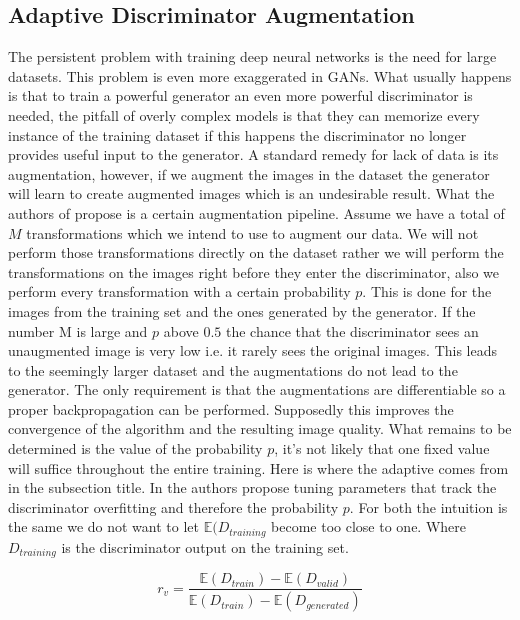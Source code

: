 \documentclass[conference]{IEEEtran}
\begin{document}
\subsection{Adaptive Discriminator Augmentation}
The persistent problem with training deep neural networks is the need for large datasets. This problem is even more exaggerated in GANs. What usually happens is that to train a powerful generator an even more powerful discriminator is needed, the pitfall of overly complex models is that they can memorize every instance of the training dataset if this happens the discriminator no longer provides useful input to the generator.
A standard remedy for lack of data is its augmentation, however, if we augment the images in the dataset the generator will learn to create augmented images which is an undesirable result. What the authors of \cite{STLEGAN2ADA} propose is a certain augmentation pipeline. Assume we have a total of $M$ transformations which we intend to use to augment our data. We will not perform those transformations directly on the dataset rather we will perform the transformations on the images right before they enter the discriminator, also we perform every transformation with a certain probability $p$. This is done for the images from the training set and the ones generated by the generator.
If the number M is large and $p$ above $0.5$ the chance that the discriminator sees an unaugmented image is very low i.e. it rarely sees the original images. This leads to the seemingly larger dataset and the augmentations do not lead to the generator. The only requirement is that the augmentations are differentiable so a proper backpropagation can be performed. Supposedly this improves the convergence of the algorithm and the resulting image quality.
What remains to be determined is the value of the probability $p$, it’s not likely that one fixed value will suffice throughout the entire training. Here is where the adaptive comes from in the subsection title. In \cite{STYLEGAN2ADA} the authors propose tuning parameters that track the discriminator overfitting and therefore the probability $p$. For both the intuition is the same we do not want to let $\mathbb{E}(D_{training}$ become too close to one. Where $D_{training}$ is the discriminator output on the training set.

\begin{equation}
	r_v = \frac{\mathbb{E}(D_{train}) -\mathbb{E}(D_{valid})}{\mathbb{E}(D_{train}) -\mathbb{E}(D_{generated})}
\end{equation}
\end{document}
